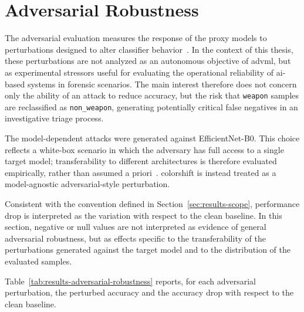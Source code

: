 \section{Adversarial Robustness}
\label{sec:results-adversarial}

The adversarial evaluation measures the response of the proxy models to
perturbations designed to alter classifier
behavior~\cite{szegedy2014intriguing,goodfellow2015explaining,biggio2018wild}.
In the context of this thesis, these perturbations are not analyzed as an
autonomous objective of \gls{advml}, but as experimental stressors
useful for evaluating the operational reliability of \gls{ai}-based systems in forensic
scenarios. The main interest therefore does not concern only the ability of an
attack to reduce accuracy, but the risk that \texttt{weapon} samples are
reclassified as \texttt{non\_weapon}, generating potentially critical false
negatives in an investigative triage process.

The model-dependent attacks were generated against EfficientNet-B0. This choice
reflects a white-box scenario in which the adversary has full access to a
single target model; transferability to different architectures is therefore
evaluated empirically, rather than assumed a
priori~\cite{biggio2018wild,nowroozi2021survey,barni2018cf}. \gls{colorshift}
is instead treated as a model-agnostic adversarial-style perturbation.

Consistent with the convention defined in Section~\ref{sec:results-scope},
performance drop is interpreted as the variation with respect to the clean
baseline. In this section, negative or null values are not interpreted as
evidence of general adversarial robustness, but as effects specific to the
transferability of the perturbations generated against the target model and to
the distribution of the evaluated samples.

Table~\ref{tab:results-adversarial-robustness} reports, for each adversarial
perturbation, the perturbed accuracy and the accuracy drop with respect to the
clean baseline.

